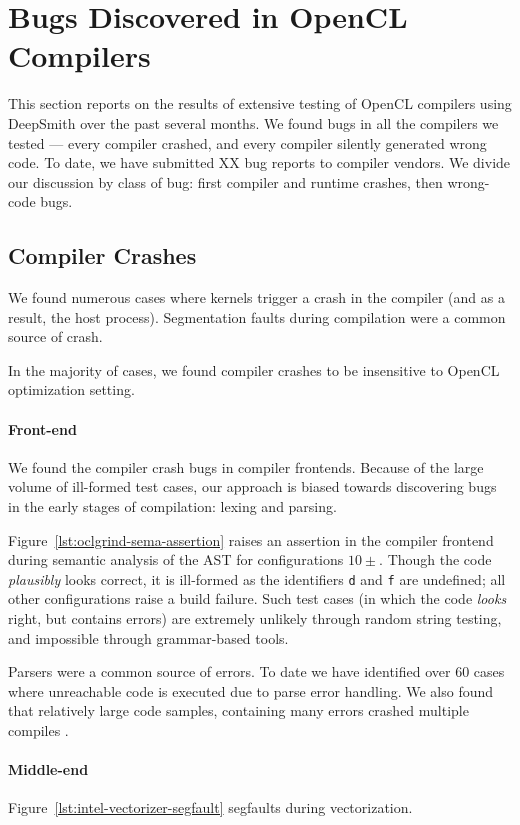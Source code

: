 \section{Bugs Discovered in OpenCL Compilers}

This section reports on the results of extensive testing of OpenCL compilers using DeepSmith over the past several months. We found bugs in all the compilers we tested --- every compiler crashed, and every compiler silently generated wrong code. To date, we have submitted XX bug reports to compiler vendors. We divide our discussion by class of bug: first compiler and runtime crashes, then wrong-code bugs.

\subsection{Compiler Crashes}

We found numerous cases where kernels trigger a crash in the compiler (and as a result, the host process). Segmentation faults during compilation were a common source of crash.

In the majority of cases, we found compiler crashes to be insensitive to OpenCL optimization setting.


\paragraph{Front-end} We found the compiler crash bugs in compiler frontends. Because of the large volume of ill-formed test cases, our approach is biased towards discovering bugs in the early stages of compilation: lexing and parsing.

Figure~\ref{lst:oclgrind-sema-assertion} raises an assertion in the compiler frontend during semantic analysis of the AST for configurations $10\pm$. Though the code \emph{plausibly} looks correct, it is ill-formed as the identifiers \texttt{d} and \texttt{f} are undefined; all other configurations raise a build failure. Such test cases (in which the code \emph{looks} right, but contains errors) are extremely unlikely through random string testing, and impossible through grammar-based tools.

Parsers were a common source of errors. To date we have identified over 60 cases where unreachable code is executed due to parse error handling. We also found that relatively large code samples, containing many errors crashed multiple compiles .

\paragraph{Middle-end} Figure~\ref{lst:intel-vectorizer-segfault} segfaults during vectorization.

